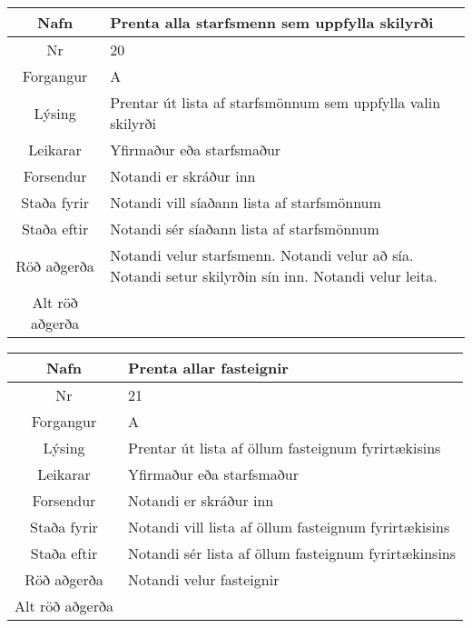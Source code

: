 \caption{Use case 19}\label{tab:use_case_19}
\begin{table}[h!]\centering
\begin{tabular}{|c|p{10cm}|}
\hline
Nafn&Prenta alla starfsmenn sem uppfylla skilyrði\\
\hline
Nr&20\\
\hline
Forgangur&A\\
\hline
Lýsing&Prentar út lista af starfsmönnum sem uppfylla valin skilyrði\\
\hline
Leikarar&Yfirmaður eða starfsmaður\\
\hline
Forsendur&Notandi er skráður inn\\
\hline
Staða fyrir&Notandi vill síaðann lista af starfsmönnum\\
\hline
Staða eftir&Notandi sér síaðann lista af starfsmönnum\\
\hline
Röð aðgerða&Notandi velur starfsmenn. Notandi velur að sía. Notandi setur skilyrðin sín inn. Notandi velur leita.\\
\hline
Alt röð aðgerða&\\
\hline
\end{tabular}
\end{table}
\caption{Use case 20}\label{tab:use_case_20}
\begin{table}[h!]\centering
\begin{tabular}{|c|p{10cm}|}
\hline
Nafn&Prenta allar fasteignir\\
\hline
Nr&21\\
\hline
Forgangur&A\\
\hline
Lýsing&Prentar út lista af öllum fasteignum fyrirtækisins\\
\hline
Leikarar&Yfirmaður eða starfsmaður\\
\hline
Forsendur&Notandi er skráður inn\\
\hline
Staða fyrir&Notandi vill lista af öllum fasteignum fyrirtækisins\\
\hline
Staða eftir&Notandi sér lista af öllum fasteignum fyrirtækinsins\\
\hline
Röð aðgerða&Notandi velur fasteignir\\
\hline
Alt röð aðgerða&\\
\hline
\end{tabular}
\end{table}
\caption{Use case 21}\label{tab:use_case_21}
